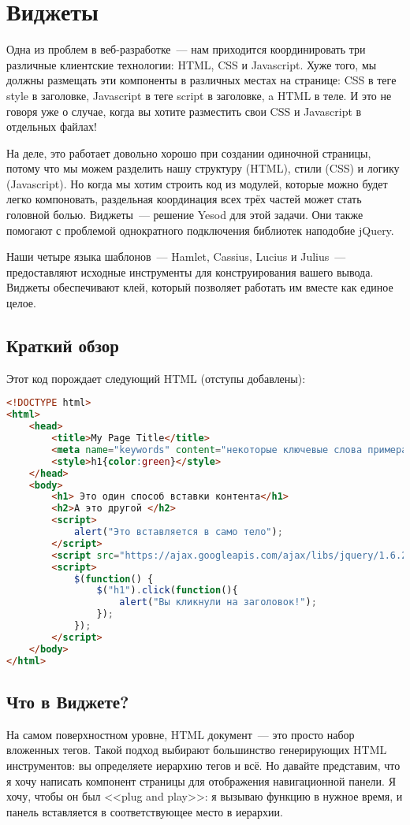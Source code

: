 \chapter{Виджеты}\label{chap:widgets}
Одна из проблем в веб-разработке~--- нам приходится координировать три
различные клиентские технологии: HTML, CSS и Javascript. Хуже того, мы должны
размещать эти компоненты в различных местах на странице: CSS в теге style в
заголовке, Javascript в теге script в заголовке, a HTML в теле. И это не говоря
уже о случае, когда вы хотите разместить свои CSS и Javascript в отдельных
файлах!

На деле, это работает довольно хорошо при создании одиночной страницы, потому
что мы можем разделить нашу структуру (HTML), стили (CSS) и логику
(Javascript). Но когда мы хотим строить код из модулей, которые можно будет
легко компоновать, раздельная координация всех трёх частей может стать головной
болью. Виджеты~--- решение Yesod для этой задачи. Они также помогают с
проблемой однократного подключения библиотек наподобие jQuery.

Наши четыре языка шаблонов~--- Hamlet, Cassius, Lucius и Julius~---
предоставляют исходные инструменты для конструирования вашего вывода. Виджеты
обеспечивают клей, который позволяет работать им вместе как единое целое.

\section{Краткий обзор}
Этот код порождает следующий HTML (отступы добавлены):
\begin{lstlisting}[language=HTML]
<!DOCTYPE html>
<html>
    <head>
        <title>My Page Title</title>
        <meta name="keywords" content="некоторые ключевые слова примера">
        <style>h1{color:green}</style>
    </head>
    <body>
        <h1> Это один способ вставки контента</h1>
        <h2>А это другой </h2>
        <script>
            alert("Это вставляется в само тело");
        </script>
        <script src="https://ajax.googleapis.com/ajax/libs/jquery/1.6.2/jquery.min.js"></script>
        <script>
            $(function() {
                $("h1").click(function(){
                    alert("Вы кликнули на заголовок!");
                });
            });
        </script>
    </body>
</html>
\end{lstlisting}

\section{Что в Виджете?}
На самом поверхностном уровне, HTML документ~--- это просто набор вложенных
тегов. Такой подход выбирают большинство генерирующих HTML инструментов: вы
определяете иерархию тегов и всё. Но давайте представим, что я хочу
написать компонент страницы для отображения навигационной панели. Я хочу, чтобы
он был <<plug and play>>: я вызываю функцию в нужное время, и панель
вставляется в соответствующее место в иерархии.

